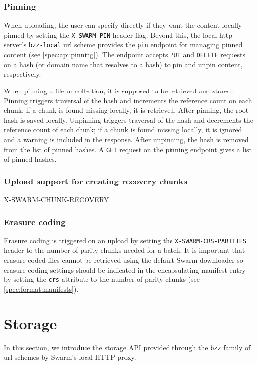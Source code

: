 \subsubsection{Pinning}

When uploading, the user can specify directly if they want the content locally pinned by setting the \texttt{X-SWARM-PIN} header flag. Beyond this, the local http server's \texttt{bzz-local} url scheme provides the \texttt{pin}  endpoint for managing pinned content (see \ref{spec:api:pinning}). The endpoint  accepts \texttt{PUT} and \texttt{DELETE} requests on a hash (or domain name that resolves to a hash) to pin and unpin content, respectively.

When pinning a file or collection, it is supposed to be retrieved and stored. Pinning triggers traversal of the hash and increments the reference count on each chunk; if a chunk is found missing locally, it is retrieved. After pinning,  the root hash is saved locally. Unpinning triggers traversal of the hash and decrements the reference count of each chunk; if a chunk is found missing locally, it is ignored and a warning is included in the response. After unpinning, the hash is removed from the list of pinned hashes. A \texttt{GET} request on the pinning endpoint gives a list of pinned hashes.  

\subsubsection{Upload support for creating recovery chunks}
X-SWARM-CHUNK-RECOVERY

\subsubsection{Erasure coding}

Erasure coding is triggered on an upload by setting the \texttt{X-SWARM-CRS-PARITIES} header to the number of parity chunks needed for a batch. It is important that erasure coded files cannot be retrieved using the default Swarm downloader so erasure coding settings should be indicated in the encapsulating manifest entry by setting the \texttt{crs} attribute  to the number of parity chunks (see \ref{spec:format:manifests}). 

\section{Storage}\label{sec:storage-ux}

In this section, we introduce the storage API provided through the \texttt{bzz} family of url schemes by Swarm's local  HTTP proxy.

